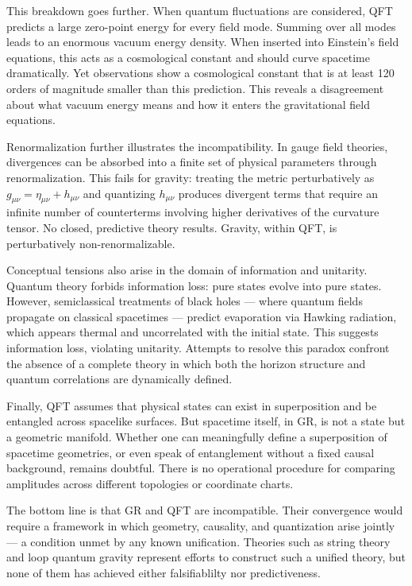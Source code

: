This breakdown goes further. When quantum fluctuations are considered, QFT predicts a large zero-point energy for every field mode. Summing over all modes leads to an enormous vacuum energy density. When inserted into Einstein’s field equations, this acts as a cosmological constant and should curve spacetime dramatically. Yet observations show a cosmological constant that is at least 120 orders of magnitude smaller than this prediction. This reveals a disagreement about what vacuum energy means and how it enters the gravitational field equations.

Renormalization further illustrates the incompatibility. In gauge field theories, divergences can be absorbed into a finite set of physical parameters through renormalization. This fails for gravity: treating the metric perturbatively as $g_{\mu\nu} = \eta_{\mu\nu} + h_{\mu\nu}$ and quantizing $h_{\mu\nu}$ produces divergent terms that require an infinite number of counterterms involving higher derivatives of the curvature tensor. No closed, predictive theory results. Gravity, within QFT, is perturbatively non-renormalizable.

Conceptual tensions also arise in the domain of information and unitarity. Quantum theory forbids information loss: pure states evolve into pure states. However, semiclassical treatments of black holes — where quantum fields propagate on classical spacetimes — predict evaporation via Hawking radiation, which appears thermal and uncorrelated with the initial state. This suggests information loss, violating unitarity. Attempts to resolve this paradox confront the absence of a complete theory in which both the horizon structure and quantum correlations are dynamically defined.

Finally, QFT assumes that physical states can exist in superposition and be entangled across spacelike surfaces. But spacetime itself, in GR, is not a state but a geometric manifold. Whether one can meaningfully define a superposition of spacetime geometries, or even speak of entanglement without a fixed causal background, remains doubtful. There is no operational procedure for comparing amplitudes across different topologies or coordinate charts.

The bottom line is that GR and QFT are incompatible. Their convergence would require a framework in which geometry, causality, and quantization arise jointly — a condition unmet by any known unification. Theories such as string theory and loop quantum gravity represent efforts to construct such a unified theory, but none of them has achieved either falsifiablilty nor predictiveness.

